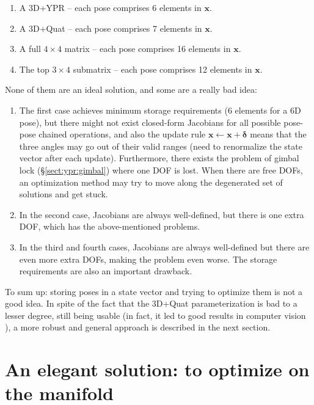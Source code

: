 \documentclass[a4paper,11pt]{report}
\newcommand{\DEL}{{\bm{\delta}}}
\begin{document}
\begin{enumerate}
 \item A 3D+YPR -- each pose comprises 6 elements in $\mathbf{x}$.
 \item A 3D+Quat -- each pose comprises 7 elements in $\mathbf{x}$.
 \item A full $4\times 4$ matrix -- each pose comprises 16 elements in $\mathbf{x}$.
 \item The top $3\times 4$ submatrix -- each pose comprises 12 elements in $\mathbf{x}$.
\end{enumerate}


None of them are an ideal solution, and some are a really bad idea:

\begin{enumerate}
 \item The first case achieves minimum storage requirements (6 elements for a 6D pose),
but there might not exist closed-form Jacobians for all possible pose-pose chained operations,
and also the update rule $\mathbf{x}  \leftarrow \mathbf{x} + \DEL$ means that the three
angles may go out of their valid ranges (need to renormalize the state vector after each update).
Furthermore, there exists the problem of gimbal lock (\S \ref{sect:ypr:gimbal}) where one
DOF is lost. When there are free DOFs, an optimization method may try to move along the
degenerated set of solutions and get stuck.

\item In the second case, Jacobians are always well-defined, but there is one extra DOF, which has
the above-mentioned problems.

\item In the third and fourth cases, Jacobians are always well-defined but there are
even more extra DOFs, making the problem even worse. The storage requirements are also an
important drawback.
\end{enumerate}

To sum up: storing poses in a state vector and trying to optimize
them is not a good idea.
In spite of the fact that
the 3D+Quat parameterization is bad to a lesser degree,
still being usable
(in fact, it led to good results in computer vision \cite{davison2007mrt}),
a more robust and general approach is described in the next section.


\section{An elegant solution: to optimize on the manifold}
\label{sect:opti_manif}
\end{document}
